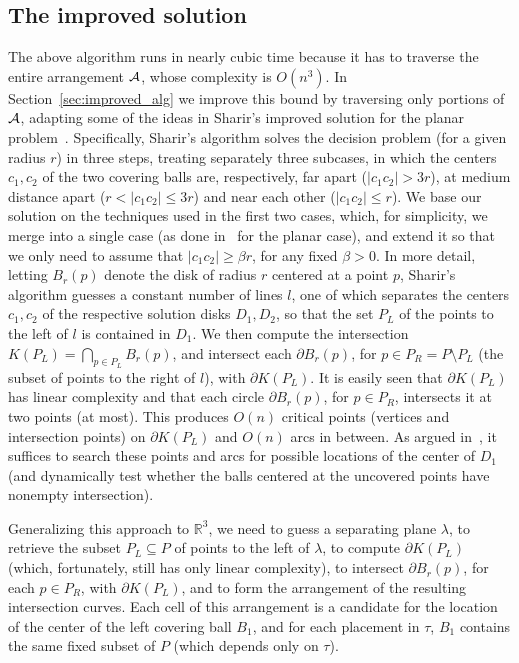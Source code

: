 \documentclass[a4paper,12pt]{article}
\def\A{{\cal A}}
\def\bd{{\partial}}
\def\reals{\mathbb{R}}
\begin{document}
\subsection{The improved solution}
\label{subsec:n^2_sketch} The above algorithm runs in nearly cubic
time because it has to traverse the entire arrangement $\A$, whose
complexity is $O(n^3)$. In Section~\ref{sec:improved_alg} we improve
this bound by traversing only portions of $\A$, adapting some of the
ideas in Sharir's improved solution for the planar
problem~\cite{MS}. Specifically, Sharir's algorithm solves the
decision problem (for a given radius $r$) in three steps, treating
separately three subcases, in which the centers $c_1, c_2$ of the
two covering balls are, respectively, far apart ($|c_1 c_2| > 3r$),
at medium distance apart ($r < |c_1 c_2| \leq 3r$) and near each
other ($|c_1 c_2| \leq r$). We base our solution on the techniques
used in the first two cases, which, for simplicity, we merge into a
single case (as done in~\cite{DEF} for the planar case), and extend
it so that we only need to assume that $|c_1c_2| \geq \beta r$, for
any fixed $\beta > 0$. In more detail, letting $B_r(p)$ denote the
disk of radius $r$ centered at a point $p$, Sharir's algorithm
guesses a constant number of lines $l$, one of which separates the
centers $c_1, c_2$ of the respective solution disks $D_1,D_2$, so
that the set $P_L$ of the points to the left of $l$ is contained in
$D_1$. We then compute the intersection $K(P_L) = \bigcap_{p \in
P_L} B_r(p)$, and intersect each $\bd{B_r(p)}$, for $p \in P_R = P
\setminus P_L$ (the subset of points to the right of $l$), with
$\bd{K(P_L)}$. It is easily seen that $\bd{K(P_L)}$ has linear
complexity and that each circle $\bd{B_r(p)}$, for $p \in P_R$,
intersects it at two points (at most). This produces $O(n)$ critical
points (vertices and intersection points) on $\bd{K(P_L)}$ and
$O(n)$ arcs in between. As argued in~\cite{MS}, it suffices to
search these points and arcs for possible locations of the center of
$D_1$ (and dynamically test whether the balls centered at the
uncovered points have nonempty intersection).

Generalizing this approach to $\reals^3$, we need to guess a separating plane $\lambda$, to retrieve the subset $P_L \subseteq P$ of points to the left of $\lambda$, to compute $\bd{K(P_L)}$ (which, fortunately, still has only linear complexity), to intersect $\bd{B_r(p)}$, for each $p \in P_R$, with $\bd{K(P_L)}$, and to form the arrangement of the resulting intersection curves. Each cell of this arrangement is a candidate for the location of the center of the left covering ball $B_1$, and for each placement in $\tau$, $B_1$ contains the same fixed subset of $P$ (which depends only on $\tau$).
\end{document}
